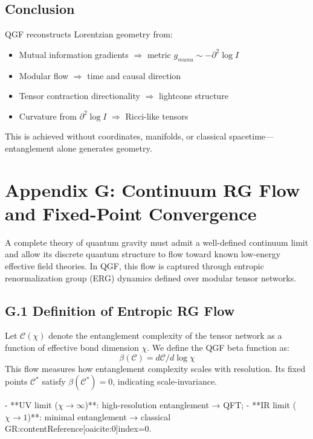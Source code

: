 \documentclass[11pt]{article}
\def\mu{mu}
\def\nu{nu}
\def\frac#1#2{#1/#2}
\begin{document}
\subsection*{Conclusion}

QGF reconstructs Lorentzian geometry from:

\begin{itemize}
  \item Mutual information gradients \( \Rightarrow \) metric \( g_{\mu\nu} \sim -\partial^2 \log I \)
  \item Modular flow \( \Rightarrow \) time and causal direction
  \item Tensor contraction directionality \( \Rightarrow \) lightcone structure
  \item Curvature from \( \partial^2 \log I \) \( \Rightarrow \) Ricci-like tensors
\end{itemize}

This is achieved without coordinates, manifolds, or classical spacetime—entanglement alone generates geometry.



\section*{Appendix G: Continuum RG Flow and Fixed-Point Convergence}

A complete theory of quantum gravity must admit a well-defined continuum limit and allow its discrete quantum structure to flow toward known low-energy effective field theories. In QGF, this flow is captured through entropic renormalization group (ERG) dynamics defined over modular tensor networks.

\subsection*{G.1 Definition of Entropic RG Flow}

Let \( \mathcal{C}(\chi) \) denote the entanglement complexity of the tensor network as a function of effective bond dimension \( \chi \). We define the QGF beta function as:
\[
\beta(\mathcal{C}) = \frac{d \mathcal{C}}{d \log \chi}
\]
This flow measures how entanglement complexity scales with resolution. Its fixed points \( \mathcal{C}^* \) satisfy \( \beta(\mathcal{C}^*) = 0 \), indicating scale-invariance.

- **UV limit (\( \chi \to \infty \))**: high-resolution entanglement → QFT;
- **IR limit (\( \chi \to 1 \))**: minimal entanglement → classical GR:contentReference[oaicite:0]{index=0}.
\end{document}
